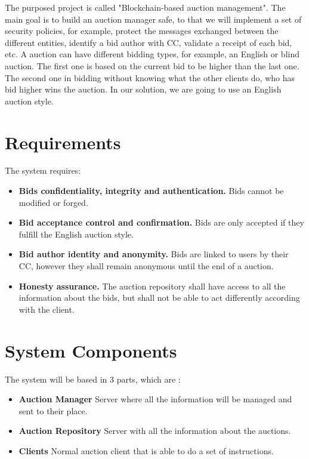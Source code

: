 \documentclass[pdftex,12pt,a4paper]{report}
\begin{document}
The purposed project is called "Blockchain-based auction management". The main goal is to build an auction manager safe, to that we will implement a set of security policies, for example, protect the messages exchanged between the different entities, identify a bid author with CC, validate a receipt of each bid, etc. A auction can have different bidding types, for example, an English or blind auction. The first one is based on the current bid to be higher than the last one. The second one in bidding without knowing what the other clients do, who has bid higher wins the auction. In our solution, we are going to use an English auction style.

\newpage
\section{Requirements}

The system requires:

\begin{itemize}
\item \textbf{Bids confidentiality, integrity and authentication.} Bids cannot be modified or forged.
\item \textbf{Bid acceptance control and confirmation.} Bids are only accepted if they fulfill the English auction style. 
\item \textbf{Bid author identity and anonymity.} Bids are linked to users by their CC, however they shall remain anonymous until the end of a auction.
\item \textbf{Honesty assurance.} The auction repository shall have access to all the information about the bids, but shall not be able to act differently according with the client.
\end{itemize}

\vskip 2cm
\section{System Components}

The system will be based in 3 parts, which are :

\begin{itemize}
\item \textbf{Auction Manager} Server where all the information will be managed and sent to their place.
\item \textbf{Auction Repository} Server with all the information about the auctions. 
\item \textbf{Clients} Normal auction client that is able to do a set of instructions.
\end{itemize}
\end{document}

